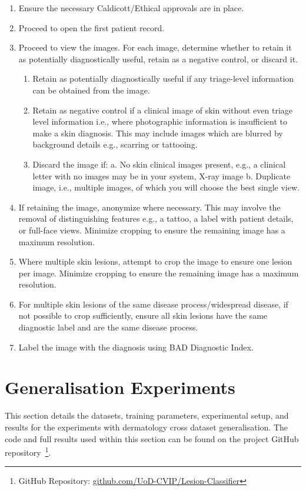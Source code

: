 \begin{enumerate}
	\item Ensure the necessary Caldicott/Ethical approvals are in place. 
	\item Proceed to open the first patient record.
	\item Proceed to view the images. For each image, determine whether to retain it as potentially diagnostically useful, retain as a negative control, or discard it.
	\begin{enumerate}
		\item Retain as potentially diagnostically useful if any triage-level information can be obtained from the image.
		\item Retain as negative control if a clinical image of skin without even triage level information i.e., where photographic information is insufficient to make a skin diagnosis. This may include images which are blurred by background details e.g., scarring or tattooing.
		\item Discard the image if: a. No skin clinical images present, e.g., a clinical letter with no images may be in your system, X-ray image b. Duplicate image, i.e., multiple images, of which you will choose the best single view.
	\end{enumerate}
	\item If retaining the image, anonymize where necessary. This may involve the removal of distinguishing features e.g., a tattoo, a label with patient details, or full-face views. Minimize cropping to ensure the remaining image has a maximum resolution. 
	\item Where multiple skin lesions, attempt to crop the image to ensure one lesion per image. Minimize cropping to ensure the remaining image has a maximum resolution.
	\item For multiple skin lesions of the same disease process/widespread disease, if not possible to crop sufficiently, ensure all skin lesions have the same diagnostic label and are the same disease process.
	\item Label the image with the diagnosis using BAD Diagnostic Index.
\end{enumerate}



\section{Generalisation Experiments}
\label{sec:generalisation_experiments}
This section details the datasets, training parameters, experimental setup, and results for the experiments with dermatology cross dataset generalisation. The code and full results used within this section can be found on the project GitHub repository~\footnote{GitHub Repository: \url{github.com/UoD-CVIP/Lesion-Classifier}}.

